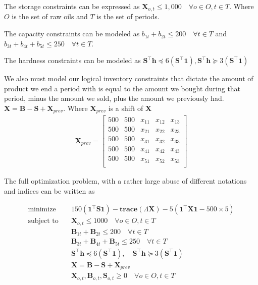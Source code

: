 The storage constraints can be expressed as $\textbf{X}_{o,t} \leq 1,000 \quad \forall o \in O, t \in T$. 
Where $O$ is the set of raw oils and $T$ is the set of periods.

The capacity constraints can be modeled as $b_{1t} + b_{2t} \leq 200 \quad \forall t \in T$ and $b_{3t} + b_{4t} + b_{5t} \leq 250 \quad \forall t \in T$.

The hardness constraints can be modeled as $\textbf{S}^\top \textbf{h} \preceq 6 (\textbf{S}^\top \textbf{1}), \textbf{S}^\top \textbf{h} \succeq 3 (\textbf{S}^\top \textbf{1}) $

We also must model our logical inventory constraints that dictate the amount of product we end a period with is equal to the amount we bought during that period, minus the amount we sold, plus the amount we previously had.
$\textbf{X} = \textbf{B} - \textbf{S} + \textbf{X}_{prev}$. Where $\textbf{X}_{prev}$ is a shift of $\textbf{X}$ 
\begin{align}
  \textbf{X}_{prev} = 
  \begin{bmatrix}
    500 & 500 & x_{11} & x_{12} & x_{13} \\
    500 & 500 & x_{21} & x_{22} & x_{23} \\
    500 & 500 & x_{31} & x_{32} & x_{33} \\
    500 & 500 & x_{41} & x_{42} & x_{43} \\
    500 & 500 & x_{51} & x_{52} & x_{53} \\
  \end{bmatrix}
\end{align}

The full optimization problem, with a rather large abuse of different notations and indices can be written as 

\begin{align}
  \text{minimize} & \quad 150(\textbf{1}^\top \textbf{S} \textbf{1}) - \textbf{trace}(\Lambda \textbf{X}) - 5(\textbf{1}^\top \textbf{X} \textbf{1} - 500 \times 5) \\
  \text{subject to} & \quad \textbf{X}_{o, t} \leq 1000 \quad \forall o \in O, t \in T \\
  & \quad \textbf{B}_{1t} + \textbf{B}_{2t} \leq 200 \quad \forall t \in T \\
  & \quad \textbf{B}_{3t} + \textbf{B}_{4t} + \textbf{B}_{5t} \leq 250 \quad \forall t \in T \\
  & \quad \textbf{S}^\top \textbf{h} \preceq 6 (\textbf{S}^\top \textbf{1}), \quad \textbf{S}^\top \textbf{h} \succeq 3 (\textbf{S}^\top \textbf{1}) \\
  & \quad \textbf{X} = \textbf{B} - \textbf{S} + \textbf{X}_{prev} \\
  & \quad \textbf{X}_{o,t}, \textbf{B}_{o,t}, \textbf{S}_{o,t} \geq 0 \quad \forall o \in O, t \in T
\end{align}